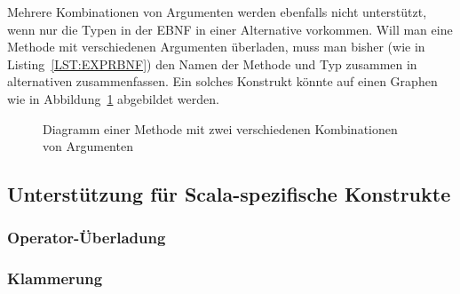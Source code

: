 \documentclass[../InterneDSLs.tex]{subfiles}
\begin{document}
Mehrere Kombinationen von Argumenten werden ebenfalls nicht unterstützt, wenn nur die Typen in der EBNF in einer Alternative vorkommen. Will man eine Methode mit verschiedenen Argumenten überladen, muss man bisher (wie in Listing~\ref{LST:EXPRBNF}) den Namen der Methode und Typ zusammen in alternativen zusammenfassen. Ein solches Konstrukt könnte auf einen Graphen wie in Abbildung~\ref{FIG:DiagramMethodTwoCombinationsArguments} abgebildet werden.
\begin{figure}[ht]
\centering
{}
\caption{Diagramm einer Methode mit zwei verschiedenen Kombinationen von Argumenten}
\label{FIG:DiagramMethodTwoCombinationsArguments}
\end{figure}


\subsection{Unterstützung für Scala-spezifische Konstrukte}
\subsubsection{Operator-Überladung}
\subsubsection{Klammerung}
\end{document}
